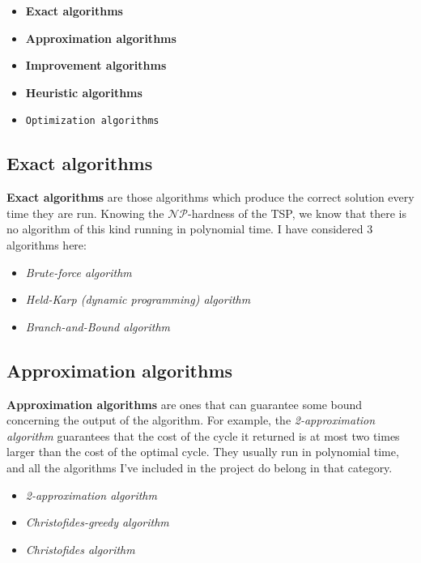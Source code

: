 \documentclass[12pt,twoside,notitlepage]{report}
\begin{document}
\begin{itemize}

\item {\bf Exact algorithms}
\item {\bf Approximation algorithms}
\item {\bf Improvement algorithms}
\item {\bf Heuristic algorithms}
\item {\tt Optimization algorithms} 
\end{itemize}

\subsection{Exact algorithms}

{\bf Exact algorithms} are those algorithms which produce the correct solution every time they are run. Knowing the $\mathcal{NP}$-hardness of the TSP, we know that there is no algorithm of this kind running in polynomial time. I have considered 3 algorithms here:

\begin{itemize}

\item {\it Brute-force algorithm}
\item {\it Held-Karp (dynamic programming) algorithm}
\item {\it Branch-and-Bound algorithm}

\end{itemize}

\subsection{Approximation algorithms}

{\bf Approximation algorithms} are ones that can guarantee some bound concerning the output of the algorithm. For example, the {\it 2-approximation algorithm} guarantees that the cost of the cycle it returned is at most two times larger than the cost of the optimal cycle. They usually run in polynomial time, and all the algorithms I've included in the project do belong in that category.

\begin{itemize}

\item {\it 2-approximation algorithm}
\item {\it Christofides-greedy algorithm}
\item {\it Christofides algorithm}

\end{itemize}
\end{document}
